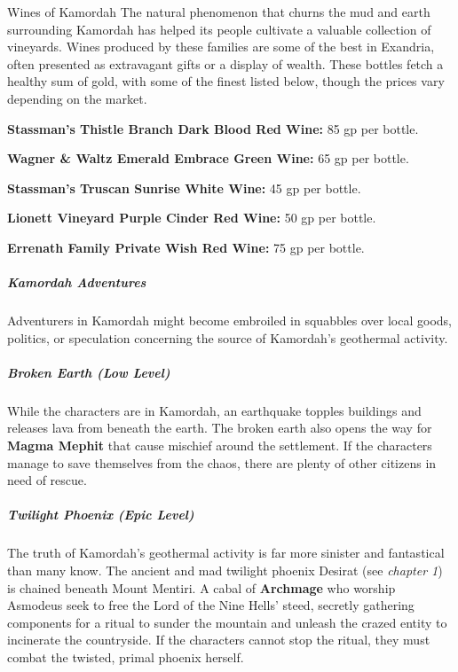 \documentclass[10pt,a4paper,twoside,bg=print,twocolumn,openany,nodeprecatedcode]{dndbook}
\begin{document}
\begin{DndSidebar}[float=!b]{Wines of Kamordah}
The natural phenomenon that churns the mud and earth surrounding Kamordah has helped its people cultivate a valuable collection of vineyards. Wines produced by these families are some of the best in Exandria, often presented as extravagant gifts or a display of wealth. These bottles fetch a healthy sum of gold, with some of the finest listed below, though the prices vary depending on the market.



\textbf{Stassman's Thistle Branch Dark Blood Red Wine:} 85 gp per bottle.



\textbf{Wagner \& Waltz Emerald Embrace Green Wine:} 65 gp per bottle.



\textbf{Stassman's Truscan Sunrise White Wine:} 45 gp per bottle.



\textbf{Lionett Vineyard Purple Cinder Red Wine:} 50 gp per bottle.



\textbf{Errenath Family Private Wish Red Wine:} 75 gp per bottle.



\end{DndSidebar}

\subparagraph{Kamordah Adventures}
Adventurers in Kamordah might become embroiled in squabbles over local goods, politics, or speculation concerning the source of Kamordah's geothermal activity.

\subparagraph{Broken Earth (Low Level)}
While the characters are in Kamordah, an earthquake topples buildings and releases lava from beneath the earth. The broken earth also opens the way for \textbf{Magma Mephit} that cause mischief around the settlement. If the characters manage to save themselves from the chaos, there are plenty of other citizens in need of rescue.

\subparagraph{Twilight Phoenix (Epic Level)}
The truth of Kamordah's geothermal activity is far more sinister and fantastical than many know. The ancient and mad twilight phoenix Desirat (see \textit{chapter 1}) is chained beneath Mount Mentiri. A cabal of \textbf{Archmage} who worship Asmodeus seek to free the Lord of the Nine Hells' steed, secretly gathering components for a ritual to sunder the mountain and unleash the crazed entity to incinerate the countryside. If the characters cannot stop the ritual, they must combat the twisted, primal phoenix herself.
\end{document}
